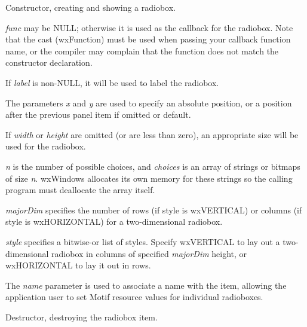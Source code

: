 
Constructor, creating and showing a radiobox.

{\it func} may be NULL; otherwise it is used as the callback for the
radiobox.  Note that the cast (wxFunction) must be used when passing your
callback function name, or the compiler may complain that the function
does not match the constructor declaration.

If {\it label} is non-NULL, it will be used to label the radiobox.

The parameters {\it x} and {\it y} are used to specify an absolute
position, or a position after the previous panel item if omitted or
default.

If {\it width} or {\it height} are omitted (or are less than zero), an
appropriate size will be used for the radiobox.

{\it n} is the number of possible choices, and {\it choices} is an
array of strings or bitmaps of size {\it n}. wxWindows allocates its own memory
for these strings so the calling program must deallocate the array
itself.

{\it majorDim} specifies the number of rows (if style is wxVERTICAL) or columns (if style is wxHORIZONTAL) for a two-dimensional
radiobox.

{\it style} specifies a bitwise-or list of styles. Specify wxVERTICAL to lay
out a two-dimensional radiobox in columns of specified {\it majorDim} height, or wxHORIZONTAL to lay it out in rows.

The {\it name} parameter is used to associate a name with the item,
allowing the application user to set Motif resource values for
individual radioboxes.



Destructor, destroying the radiobox item.



